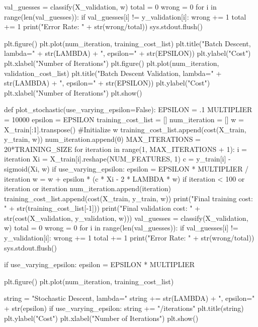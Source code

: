 \documentclass{article}
\begin{document}
\begin{python}
    val_guesses = classify(X_validation, w)
    total = 0
    wrong = 0
    for i in range(len(val_guesses)):
        if val_guesses[i] != y_validation[i]:
            wrong += 1
        total += 1
    print("Error Rate: " + str(wrong/total))
    sys.stdout.flush()

    plt.figure()
    plt.plot(num_iteration, training_cost_list)
    plt.title("Batch Descent, lambda="
        + str(LAMBDA) + ", epsilon=" + str(EPSILON))
    plt.ylabel("Cost")
    plt.xlabel("Number of Iterations")
    plt.figure()
    plt.plot(num_iteration, validation_cost_list)
    plt.title("Batch Descent Validation, lambda="
        + str(LAMBDA) + ", epsilon=" + str(EPSILON))
    plt.ylabel("Cost")
    plt.xlabel("Number of Iterations")
    plt.show()

def plot_stochastic(use_varying_epsilon=False):
    EPSILON = .1
    MULTIPLIER = 10000
    epsilon = EPSILON
    training_cost_list = []
    num_iteration = []
    w = X_train[:1].transpose() #Initialize w
    training_cost_list.append(cost(X_train, y_train, w))
    num_iteration.append(0)
    MAX_ITERATIONS = 20*TRAINING_SIZE
    for iteration in range(1, MAX_ITERATIONS + 1):
        i = iteration %
        Xi = X_train[i].reshape(NUM_FEATURES, 1)
        c = y_train[i] - sigmoid(Xi, w)
        if use_varying_epsilon:
            epsilon = EPSILON * MULTIPLIER / iteration
        w = w + epsilon * (c * Xi - 2 * LAMBDA * w)
        if iteration < 100 or iteration %
            or iteration %
            num_iteration.append(iteration)
            training_cost_list.append(cost(X_train, y_train, w))
    print("Final training cost: " + str(training_cost_list[-1]))
    print("Final validation cost: " + str(cost(X_validation, y_validation, w)))
    val_guesses = classify(X_validation, w)
    total = 0
    wrong = 0
    for i in range(len(val_guesses)):
        if val_guesses[i] != y_validation[i]:
            wrong += 1
        total += 1
    print("Error Rate: " + str(wrong/total))
    sys.stdout.flush()

    if use_varying_epsilon:
        epsilon = EPSILON * MULTIPLIER

    plt.figure()
    plt.plot(num_iteration, training_cost_list)

    string = "Stochastic Descent, lambda="
    string += str(LAMBDA) + ", epsilon=" + str(epsilon)
    if use_varying_epsilon:
        string += "/iterations"
    plt.title(string)
    plt.ylabel("Cost")
    plt.xlabel("Number of Iterations")
    plt.show()


\end{python}
\end{document}

